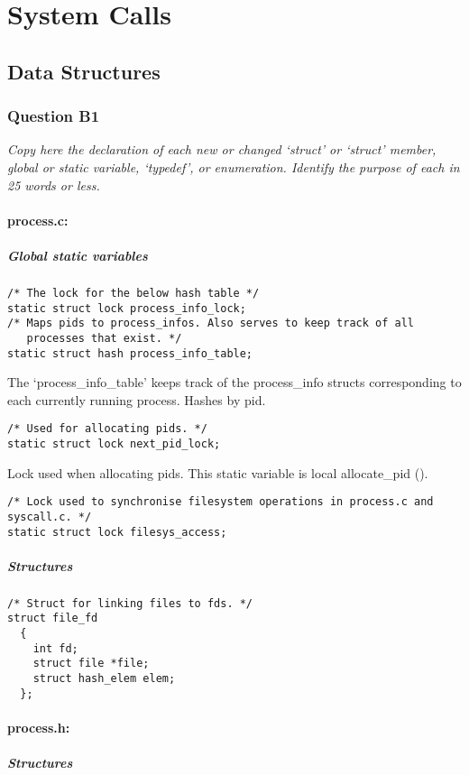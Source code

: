 \section{System Calls}
\subsection{Data Structures}
\subsubsection*{Question B1} %
\textit{Copy here the declaration of each new or changed `struct' or `struct' member, global or static variable, `typedef', or enumeration.  Identify the purpose of each in 25 words or less.}

\paragraph{process.c:}
\subparagraph{Global static variables}

\begin{verbatim}
/* The lock for the below hash table */
static struct lock process_info_lock;
/* Maps pids to process_infos. Also serves to keep track of all
   processes that exist. */
static struct hash process_info_table;
\end{verbatim}
The `process\_info\_table' keeps track of the process\_info structs corresponding to each currently running process. Hashes by pid.

\begin{verbatim}
/* Used for allocating pids. */
static struct lock next_pid_lock;
\end{verbatim}
Lock used when allocating pids. This static variable is local allocate\_pid ().

\begin{verbatim}
/* Lock used to synchronise filesystem operations in process.c and syscall.c. */
static struct lock filesys_access;
\end{verbatim}

\subparagraph{Structures}

\begin{verbatim}
/* Struct for linking files to fds. */
struct file_fd
  {
    int fd;
    struct file *file;
    struct hash_elem elem;
  };
\end{verbatim}

\paragraph{process.h:}
\subparagraph{Structures}

